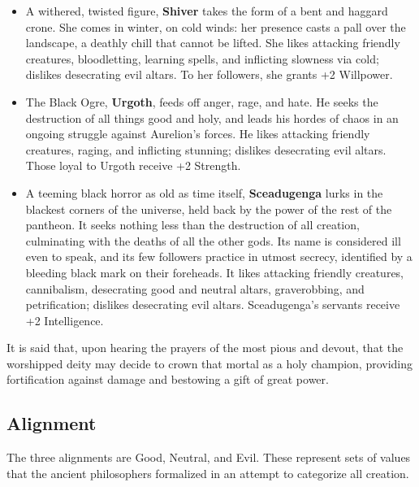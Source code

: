 \begin{itemize}
\item A withered, twisted figure, {\bf Shiver} takes the form of a bent and
haggard crone.  She comes in winter, on cold winds: her presence casts a 
pall over the landscape, a deathly chill that cannot be lifted.  She likes 
attacking friendly creatures, bloodletting, learning spells, and inflicting 
slowness via cold; dislikes desecrating evil altars.  To her followers, she 
grants +2 Willpower. 

\item The Black Ogre, {\bf Urgoth}, feeds off anger, rage, and hate.  He 
seeks the destruction of all things good and holy, and leads his hordes of 
chaos in an ongoing struggle against Aurelion's forces.  He likes attacking
friendly creatures, raging, and inflicting stunning; dislikes desecrating
evil altars.  Those loyal to Urgoth receive +2 Strength.

\item A teeming black horror as old as time itself, {\bf Sceadugenga} lurks
in the blackest corners of the universe, held back by the power of the rest
of the pantheon.  It seeks nothing less than the destruction of all 
creation, culminating with the deaths of all the other gods.  Its name is 
considered ill even to speak, and its few followers practice in utmost 
secrecy, identified by a bleeding black mark on their foreheads.  It likes 
attacking friendly creatures, cannibalism, desecrating good and neutral 
altars, graverobbing, and petrification; dislikes desecrating evil
altars.  Sceadugenga's servants receive +2 Intelligence.

\end{itemize}

It is said that, upon hearing the prayers of the most pious and devout,
that the worshipped deity may decide to crown that mortal as a holy
champion, providing fortification against damage and bestowing a gift
of great power.

\subsection{Alignment}

The three alignments are Good, Neutral, and Evil.  These represent sets
of values that the ancient philosophers formalized in an attempt to
categorize all creation.

